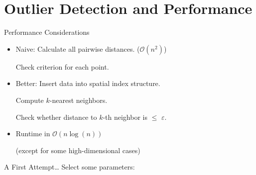 \documentclass{beamer}
\begin{document}
\section{Outlier Detection and Performance}
\begin{frame}{Performance Considerations}
    \begin{itemize}
        \item Naive: Calculate all pairwise distances. ($\mathcal{O}(n^2)$)

               Check criterion for each point.
        \item Better: Insert data into spatial index structure. 

              Compute $k$-nearest neighbors. 

              Check whether distance to $k$-th neighbor is $\leq$ $\varepsilon$.

          \item Runtime in $\mathcal{O}(n\log(n))$ 
              
              (except for some high-dimensional cases)
    \end{itemize}
\end{frame}
\begin{frame}{A First Attempt\ldots}
    Select some parameters: 
    \begin{center}
    \end{center}
\end{frame}
\end{document}
